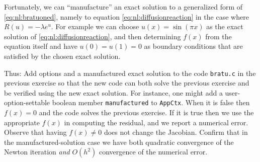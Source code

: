 \begin{enumerate}
Fortunately, we can ``manufacture'' \citep{Wesseling2001} an exact solution to a generalized form of \eqref{eq:nl:bratuoned}, namely to equation \eqref{eq:nl:diffusionreaction} in the case where $R(u)=-\lambda e^u$.  For example we can choose $u(x) = \sin(\pi x)$ as the exact solution of \eqref{eq:nl:diffusionreaction}, and then determining $f(x)$ from the equation itself and have $u(0)=u(1)=0$ as boundary conditions that are satisfied by the chosen exact solution.

Thus: Add options and a manufactured exact solution to the code \texttt{bratu.c} in the previous exercise so that the new code can both solve the previous exercise and be verified using the new exact solution.  For instance, one might add a user-option-settable boolean member \texttt{manufactured} to \texttt{AppCtx}.  When it is false then $f(x)=0$ and the code solves the previous exercise.  If it is true then we use the appropriate $f(x)$ in computing the residual, and we report a numerical error.  Observe that having $f(x)\ne 0$ does not change the Jacobian.  Confirm that in the manufactured-solution case we have both quadratic convergence of the Newton iteration \emph{and} $O(h^2)$ convergence of the numerical error.

\end{enumerate}